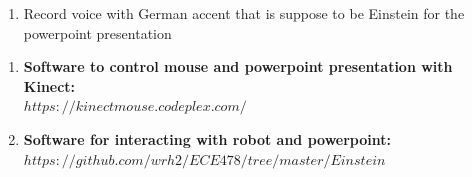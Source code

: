 \documentclass[12pt]{article}
\begin{document}
\begin{description}
\begin{enumerate}
			\item Record voice with German accent that is suppose to be Einstein for the powerpoint presentation
		\end{enumerate}
		\begin{enumerate}
			\item \textbf{Software to control mouse and powerpoint presentation with Kinect: \hfill \\
					$https://kinectmouse.codeplex.com/$}
			\item \textbf{Software for interacting with robot and powerpoint: \hfill \\
					$https://github.com/wrh2/ECE478/tree/master/Einstein$}
		\end{enumerate}		
\end{description}
\end{document}
